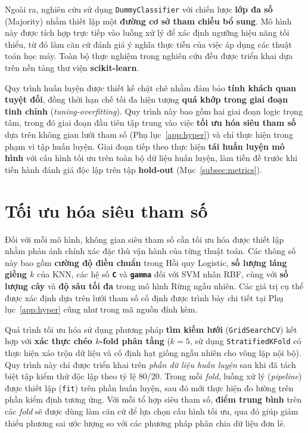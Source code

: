 \documentclass[14pt,a4paper]{extreport}
\begin{document}
Ngoài ra, nghiên cứu sử dụng \texttt{DummyClassifier} với chiến lược \textbf{lớp đa số} (Majority) nhằm thiết lập một \textbf{đường cơ sở tham chiếu bổ sung}. Mô hình này được tích hợp trực tiếp vào luồng xử lý để xác định ngưỡng hiệu năng tối thiểu, từ đó làm căn cứ đánh giá ý nghĩa thực tiễn của việc áp dụng các thuật toán học máy. Toàn bộ thực nghiệm trong nghiên cứu đều được triển khai dựa trên nền tảng thư viện \textbf{scikit-learn}.\cite{pedregosa2011}

Quy trình huấn luyện được thiết kế chặt chẽ nhằm đảm bảo \textbf{tính khách quan tuyệt đối}, đồng thời hạn chế tối đa hiện tượng \textbf{quá khớp trong giai đoạn tinh chỉnh} (\textit{tuning-overfitting}). Quy trình này bao gồm hai giai đoạn logic trọng tâm, trong đó giai đoạn đầu tiên tập trung vào việc \textbf{tối ưu hóa siêu tham số} dựa trên không gian lưới tham số (Phụ lục~\ref{app:hyper}) và chỉ thực hiện trong phạm vi tập huấn luyện. Giai đoạn tiếp theo thực hiện \textbf{tái huấn luyện mô hình} với cấu hình tối ưu trên toàn bộ dữ liệu huấn luyện, làm tiền đề trước khi tiến hành đánh giá độc lập trên tập \textbf{hold-out} (Mục~\ref{subsec:metrics}).

\section{Tối ưu hóa siêu tham số }

Đối với mỗi mô hình, không gian siêu tham số cần tối ưu hóa được thiết lập nhằm phản ánh chính xác đặc thù vận hành của từng thuật toán. Các thông số này bao gồm \textbf{cường độ điều chuẩn} trong Hồi quy Logistic, \textbf{số lượng láng giềng $k$} của KNN, các hệ số \textbf{\texttt{C}} và \textbf{\texttt{gamma}} đối với SVM nhân RBF, cùng với \textbf{số lượng cây} và \textbf{độ sâu tối đa} trong mô hình Rừng ngẫu nhiên. Các giá trị cụ thể được xác định dựa trên lưới tham số cố định được trình bày chi tiết tại Phụ lục~\ref{app:hyper} cũng như trong mã nguồn đính kèm.

Quá trình tối ưu hóa sử dụng phương pháp \textbf{tìm kiếm lưới} (\texttt{GridSearchCV}) kết hợp với \textbf{xác thực chéo $k$-fold phân tầng} ($k=5$, sử dụng \texttt{StratifiedKFold} có thực hiện xáo trộn dữ liệu và cố định hạt giống ngẫu nhiên cho vòng lặp nội bộ). Quy trình này chỉ được triển khai trên \emph{phần dữ liệu huấn luyện} sau khi đã tách biệt tập kiểm thử độc lập theo tỷ lệ 80/20. Trong mỗi \textit{fold}, luồng xử lý (\textit{pipeline}) được thiết lập (\texttt{fit}) trên phần huấn luyện, sau đó mới thực hiện đo lường trên phần kiểm định tương ứng. Với mỗi tổ hợp siêu tham số, \textbf{điểm trung bình} trên các \textit{fold} sẽ được dùng làm căn cứ để lựa chọn cấu hình tối ưu, qua đó giúp giảm thiểu phương sai ước lượng so với các phương pháp phân chia dữ liệu đơn lẻ.\cite{pedregosa2011}
\end{document}
